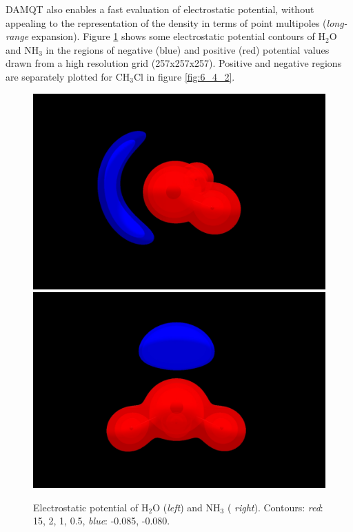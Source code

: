 \documentclass[10pt]{article}
\begin{document}
DAMQT also enables a fast evaluation of electrostatic potential, without
appealing to the representation of the density in terms of point multipoles
({\it long-range} expansion). Figure \ref{fig:6_4_1} shows some
electrostatic potential contours of H$_2$O and NH$_3$ in the regions of
negative (blue) and positive (red) potential values drawn from a high resolution grid
(257x257x257). Positive and negative regions are separately plotted for
CH$_3$Cl in figure \ref{fig:6_4_2}.

\vspace*{1cm}
\begin{figure}[H]
\begin{center}
\vspace*{-3mm}
\includegraphics[width=.4\linewidth]{H2O-pot.png}
\hspace*{5mm}
\includegraphics[width=.4\linewidth]{NH3-pot.png}
\end{center}
\caption[Electrostatic potential of H$_2$O]{Electrostatic potential of H$_2$O ({\it left}) and NH$_3$ ({\it
right}). Contours: {\it red}: 15, 2, 1, 0.5, {\it blue}: -0.085, -0.080.
\label{fig:6_4_1}}
\end{figure}
\end{document}
